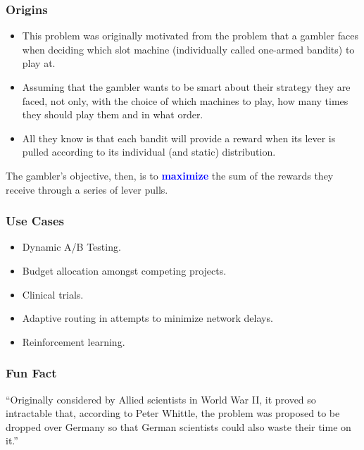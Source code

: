 \documentclass{beamer}
\begin{document}
\begin{frame}
  \frametitle{Origins}
  \begin{itemize}
    \item This problem was originally motivated from the problem that a gambler faces when deciding which slot machine (individually called one-armed bandits) to play at. \vspace{2mm} \pause
    \item Assuming that the gambler wants to be smart about their strategy they are faced, not only, with the choice of which machines to play, how many times they should play them and in what order. \vspace{2mm} \pause
    \item All they know is that each bandit will provide a reward when its lever is pulled according to its individual (and static) distribution.
  \end{itemize} \vspace{3mm} \pause

    The gambler's objective, then, is to \textbf{\textcolor{blue}{maximize}} the sum of the rewards they receive through a series of lever pulls.
\end{frame}

\begin{frame}
  \frametitle{Use Cases}
  \begin{itemize}
    \item Dynamic A/B Testing.
    \item Budget allocation amongst competing projects.
    \item Clinical trials.
    \item Adaptive routing in attempts to minimize network delays.
    \item Reinforcement learning.
  \end{itemize}
\end{frame}

\begin{frame}
  \frametitle{Fun Fact}
  \begin{block}{}
    {\large ``Originally considered by Allied scientists in World War II, it proved so intractable that, according to Peter Whittle, the problem was proposed to be dropped over Germany so that German scientists could also waste their time on it.''}
    \vspace{5mm}

    \hspace*{}
  \end{block}
\end{frame}
\end{document}
